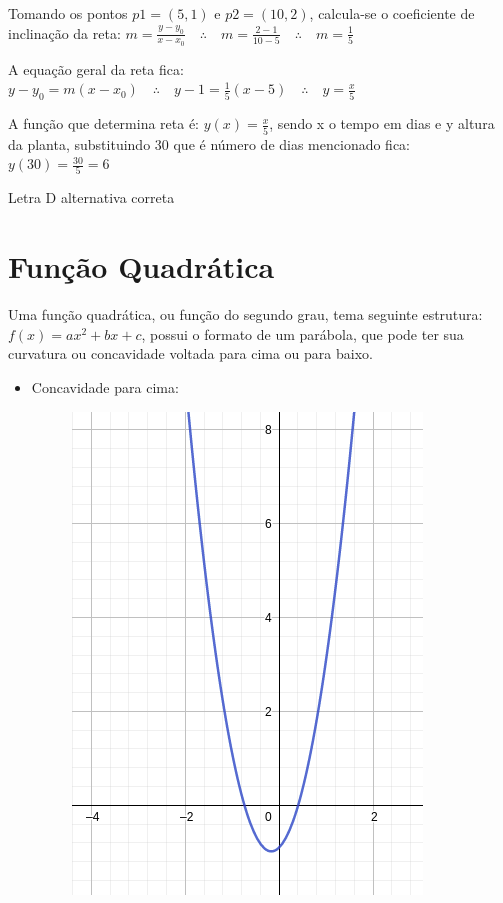 \begin{multicols*}{2}
    Tomando os pontos $p1= (5,1)$  e $p2 = (10,2)$, calcula-se o coeficiente de inclinação da reta:
    $m = \frac{y - y_0}{x - x_0} \quad \therefore \quad m = \frac{2 - 1}{10 - 5}
        \quad \therefore \quad m = \frac{1}{5}$

    A equação geral da reta fica: $y - y_0 = m(x-x_0) \quad \therefore \quad
        y -1 =  \frac{1}{5} \left(x - 5 \right) \quad \therefore \quad y = \frac{x}{5}$

    A função que determina reta é: $y(x) = \frac{x}{5}$, sendo x o tempo em dias e y altura da 				planta, substituindo 30 que é número de dias mencionado fica: $y(30) = \frac{30}{5} = 6$

    Letra D alternativa correta

    \section{Função Quadrática}
    Uma função quadrática, ou função do segundo grau, tema seguinte estrutura: $f(x) = ax^2 + bx 			+c$, possui o formato de um parábola, que pode ter sua curvatura ou concavidade voltada para 			cima ou para baixo.
    \begin{itemize}
        \item Concavidade para cima:
              \begin{figure}[H]
                  \centering
                  \includegraphics[scale=0.3]{assets/rafael/img16.png}

\end{figure}
\end{itemize}
\end{multicols*}
